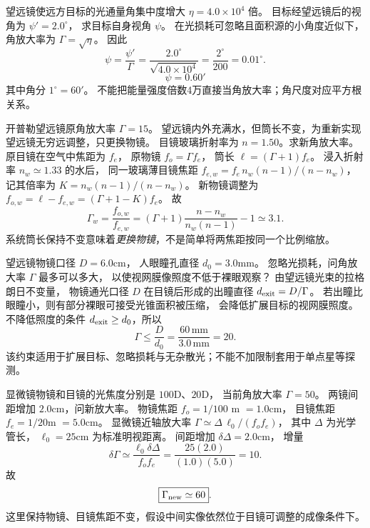 望远镜使远方目标的光通量角集中度增大
$\eta=4.0\times10^4$ 倍。
目标经望远镜后的视角为
$\psi'=2.0^\circ$，
求目标自身视角 $\psi$。
\exsolution
在光损耗可忽略且面积源的小角度近似下，
角放大率为
$\Gamma=\sqrt\eta$。
因此
\[
\psi=\frac{\psi'}{\Gamma}
=\frac{2.0^\circ}{\sqrt{4.0\times10^4}}
=\frac{2^\circ}{200}
=0.01^\circ.
\]
\[
\boxed{\psi=0.60'}
\]
其中角分 $1^\circ=60'$。
\excheck 不能把能量强度倍数4万直接当角放大率；角尺度对应平方根关系。

开普勒望远镜原角放大率 $\Gamma=15$。
望远镜内外充满水，但筒长不变，为重新实现望远镜无穷远调整，只更换物镜。
目镜玻璃折射率为 $n=1.50$。求新角放大率。
\exsolution
原目镜在空气中焦距为 $f_e$，
原物镜 $f_o=\Gamma f_e$，
筒长 $\ell=(\Gamma+1)f_e$。
浸入折射率 $n_w\simeq1.33$ 的水后，
同一玻璃薄目镜焦距
$f_{e,w}=f_e\,n_w(n-1)/(n-n_w)$，
记其倍率为
$K=n_w(n-1)/(n-n_w)$。
新物镜调整为
$f_{o,w}=\ell-f_{e,w}
=(\Gamma+1-K)f_e$。
故
\[
\boxed{\Gamma_w=
\frac{f_{o,w}}{f_{e,w}}
=(\Gamma+1)\frac{n-n_w}{n_w(n-1)}-1
\simeq3.1}.
\]
\excheck 系统筒长保持不变意味着\emph{更换物镜}，不是简单将两焦距按同一个比例缩放。

望远镜物镜口径
$D=6.0$cm，
人眼瞳孔直径
$d_0=3.0$mm。
忽略光损耗，问角放大率 $\Gamma$ 最多可以多大，
以使视网膜像照度不低于裸眼观察？
\exsolution
由望远镜光束的拉格朗日不变量，
物镜通光口径 $D$ 在目镜后形成的出瞳直径
$d_{\rm exit}=D/\Gamma$。
若出瞳比眼瞳小，则有部分裸眼可接受光锥面积被压缩，
会降低扩展目标的视网膜照度。
不降低照度的条件
$d_{\rm exit}\ge d_0$，所以
\[
\boxed{\Gamma\le\frac D{d_0}
=\frac{60\,\mathrm{mm}}{3.0\,\mathrm{mm}}
=20}.
\]
\excheck 该约束适用于扩展目标、忽略损耗与无杂散光；不能不加限制套用于单点星等探测。

显微镜物镜和目镜的光焦度分别是
$100$D、$20$D，
当前角放大率 $\Gamma=50$。
两镜间距增加 $2.0$cm，问新放大率。
\exsolution
物镜焦距 $f_o=1/100$ m $=1.0$cm，
目镜焦距 $f_e=1/20$m $=5.0$cm。
显微镜近轴放大率
$\Gamma\simeq\Delta\,\ell_0/(f_of_e)$，
其中 $\Delta$ 为光学管长，
$\ell_0=25$cm 为标准明视距离。
间距增加 $\delta\Delta=2.0$cm，
增量
\[
\delta\Gamma\simeq\frac{\ell_0\delta\Delta}
{f_of_e}
=\frac{25(2.0)}{(1.0)(5.0)}
=10.
\]
故
\[
\boxed{\Gamma_{\rm new}\simeq60}.
\]
\excheck 这里保持物镜、目镜焦距不变，假设中间实像依然位于目镜可调整的成像条件下。

